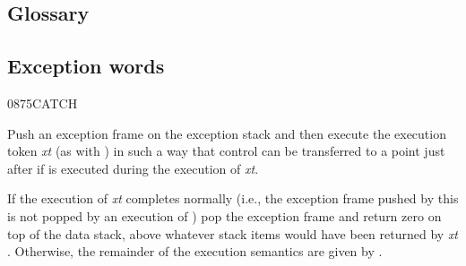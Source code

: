 \begin{info}
\subsection{Glossary}
\end{info}

\subsection{Exception words} %

\begin{newword}{0875}{CATCH}

	Push an exception frame on the exception stack and then execute
	the execution token \emph{xt} (as with ) in
	such a way that control can be transferred to a point just after
	 if  is executed during the execution of
	\emph{xt}.

	If the execution of \emph{xt} completes normally (i.e., the
	exception frame pushed by this  is not popped by an
	execution of ) pop the exception frame and return
	zero on top of the data stack, above whatever stack items would
	have been returned by \emph{xt} . Otherwise,
	the remainder of the execution semantics are given by
	.
\end{newword}


